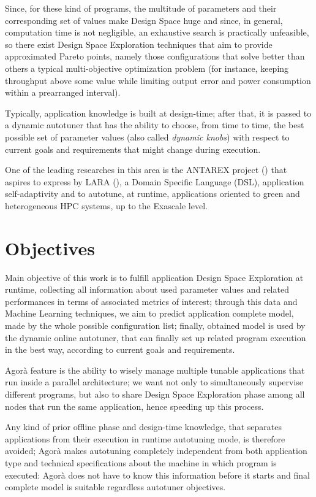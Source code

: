 Since, for these kind of programs, the multitude of parameters and their corresponding set of values make Design Space huge and since, in general, computation time is not negligible, an exhaustive search is practically unfeasible, so there exist Design Space Exploration techniques that aim to provide approximated Pareto points, namely those configurations that solve better than others a typical multi-objective optimization problem (for instance, keeping throughput above some value while limiting output error and power consumption within a prearranged interval).

Typically, application knowledge is built at design-time; after that, it is passed to a dynamic autotuner that has the ability to choose, from time to time, the best possible set of parameter values (also called \textit{dynamic knobs}) with respect to current goals and requirements that might change during execution.

One of the leading researches in this area is the ANTAREX project (\cite{silvano2016antarex}) that aspires to express by LARA (\cite{cardoso2012lara, cardoso2014performance}), a Domain Specific Language (DSL), application self-adaptivity and to autotune, at runtime, applications oriented to green and heterogeneous HPC systems, up to the Exascale level.





\section{Objectives}

Main objective of this work is to fulfill application Design Space Exploration at runtime, collecting all information about used parameter values and related performances in terms of associated metrics of interest; through this data and Machine Learning techniques, we aim to predict application complete model, made by the whole possible configuration list; finally, obtained model is used by the dynamic online autotuner, that can finally set up related program execution in the best way, according to current goals and requirements.

Agorà feature is the ability to wisely manage multiple tunable applications that run inside a parallel architecture; we want not only to simultaneously supervise different programs, but also to share Design Space Exploration phase among all nodes that run the same application, hence speeding up this process.

Any kind of prior offline phase and design-time knowledge, that separates applications from their execution in runtime autotuning mode, is therefore avoided; Agorà makes autotuning completely independent from both application type and technical specifications about the machine in which program is executed: Agorà does not have to know this information before it starts and final complete model is suitable regardless autotuner objectives.





